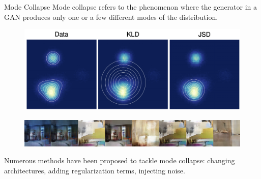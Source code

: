 \documentclass{beamer}
\begin{document}
\begin{frame}{Mode Collapse}
	Mode collapse refers to the phenomenon where the generator in a GAN produces only one or a few different modes of the distribution.
	\vspace{-0.15cm}
	\begin{figure}
		\centering
		\includegraphics[width=0.75\linewidth]{figs/mode_collapse_1}
	\end{figure}
	\vspace{-0.3cm}
	\begin{figure}
		\centering
		\includegraphics[width=1.0\linewidth]{figs/mode_collapse_4}
	\end{figure}
	Numerous methods have been proposed to tackle mode collapse: changing architectures, adding regularization terms, injecting noise.
	
\end{frame}
\end{document}
